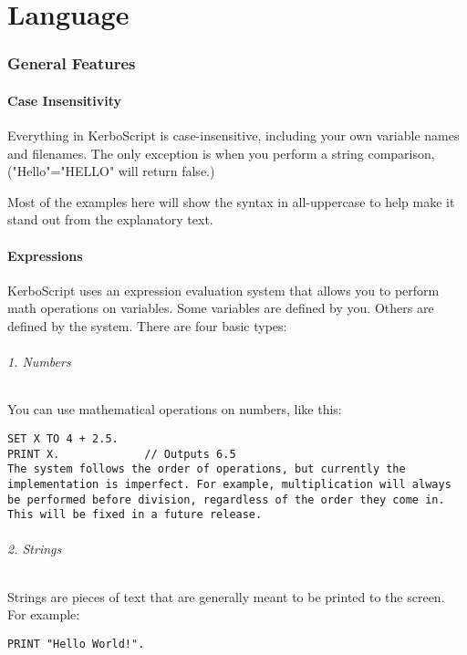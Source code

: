 \part{Language}
	\section{General Features}
		\subsection{Case Insensitivity}
Everything in KerboScript is case-insensitive, including your own variable names and filenames. The only exception is when you perform a string comparison, ("Hello"="HELLO" will return false.)

Most of the examples here will show the syntax in all-uppercase to help make it stand out from the explanatory text.

\subsection{Expressions}
KerboScript uses an expression evaluation system that allows you to perform math operations on variables. Some variables are defined by you. Others are defined by the system. There are four basic types:

\paragraph{1. Numbers}
You can use mathematical operations on numbers, like this:

\begin{Verbatim}[frame=single]
SET X TO 4 + 2.5.
PRINT X.             // Outputs 6.5
The system follows the order of operations, but currently the implementation is imperfect. For example, multiplication will always be performed before division, regardless of the order they come in. This will be fixed in a future release.
\end{Verbatim}

\paragraph{2. Strings}
Strings are pieces of text that are generally meant to be printed to the screen. For example:

\begin{Verbatim}[frame=single]
PRINT "Hello World!".
\end{Verbatim}

